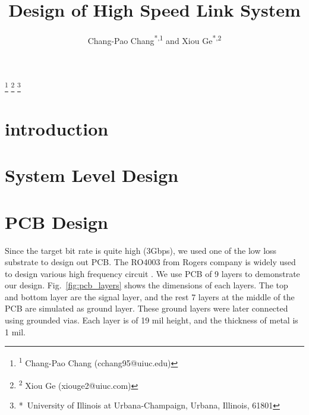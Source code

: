 \documentclass{pj}
\begin{document}
	
	
\setcounter{page}{1}
\pjheader{}

\title{Design of High Speed Link System}

\newcommand{\defaultfigurewidth}{0.5\columnwidth}

\footnote{\hskip-0.12in\textsuperscript{1} Chang-Pao Chang (cchang95@uiuc.edu)}
\footnote{\hskip-0.12in\textsuperscript{2} Xiou Ge (xiouge2@uiuc.com)}
\footnote{\hskip-0.12in*\ University of Illinois at Urbana-Champaign, Urbana, Illinois, 61801}

\author{Chang-Pao Chang\textsuperscript{*,1} and Xiou Ge\textsuperscript{*,2}}



\begin{abstract}
	
\end{abstract}
%
\section{introduction}
\label{sec:Intro}

\section{System Level Design}
\label{sec:system}

\section{PCB Design}
\label{sec:pcb_design}
Since the target bit rate is quite high (3Gbps), we used one of the low loss substrate to design out PCB. The RO4003 from Rogers company is widely used to design various high frequency circuit \cite{na_ro4003_rogers}. We use PCB of 9 layers to demonstrate our design. Fig.~\ref{fig:pcb_layers} shows the dimensions of each layers. The top and bottom layer are the signal layer, and the rest 7 layers at the middle of the PCB are simulated as ground layer. These ground layers were later connected using grounded vias. Each layer is of 19 mil height, and the thickness of metal is 1 mil.
\end{document}
